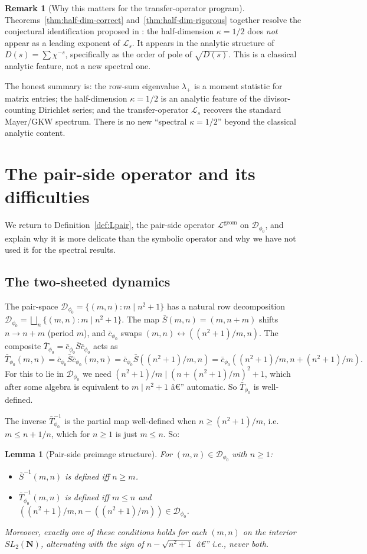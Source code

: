 ﻿\documentclass[11pt]{article}
\newtheorem{lemma}[theorem]{Lemma}
\theoremstyle{definition}
\newtheorem{remark}[theorem]{Remark}
\newcommand{\N}{\mathbf{N}}
\newcommand{\SLN}{SL_2(\N)}
\newcommand{\Dphi}{\mathcal{D}_{\phi_0}}
\newcommand{\Sb}{\bar{S}}
\newcommand{\Tb}{\bar{T}_{\phi_0}}
\newcommand{\cb}{\bar{c}_{\phi_0}}
\newcommand{\Lop}{\mathcal{L}}
\begin{document}
\begin{remark}[Why this matters for the transfer-operator program]
Theorems~\ref{thm:half-dim-correct} and~\ref{thm:half-dim-rigorous} together resolve the conjectural identification proposed in \cite[B7]{shakovnotes}: the half-dimension $\kappa=1/2$ does \emph{not} appear as a leading exponent of $\Lop_s$. It appears in the analytic structure of $D(s)=\sum\chi^{-s}$, specifically as the order of pole of $\sqrt{D(s)}$. This is a classical analytic feature, not a new spectral one.

The honest summary is: the row-sum eigenvalue $\lambda_+$ is a moment statistic for matrix entries; the half-dimension $\kappa=1/2$ is an analytic feature of the divisor-counting Dirichlet series; and the transfer-operator $\Lop_s$ recovers the standard Mayer/GKW spectrum. There is no new ``spectral $\kappa=1/2$'' beyond the classical analytic content.
\end{remark}

\section{The pair-side operator and its difficulties}\label{sec:pair-side}

We return to Definition~\ref{def:Lpair}, the pair-side operator $\Lop^{\mathrm{geom}}$ on $\Dphi$, and explain why it is more delicate than the symbolic operator and why we have not used it for the spectral results.

\subsection{The two-sheeted dynamics}

The pair-space $\Dphi=\{(m,n):m\mid n^2+1\}$ has a natural row decomposition $\Dphi=\bigsqcup_n\{(m,n):m\mid n^2+1\}$. The map $\Sb(m,n)=(m,n+m)$ shifts $n\to n+m$ (period $m$), and $\cb$ swaps $(m,n)\leftrightarrow((n^2+1)/m,n)$. The composite $\Tb=\cb\Sb\cb$ acts as
\[
\Tb(m,n) = \cb\Sb\cb(m,n) = \cb\Sb((n^2+1)/m,n) = \cb((n^2+1)/m,n+(n^2+1)/m).
\]
For this to lie in $\Dphi$ we need $(n^2+1)/m \mid (n+(n^2+1)/m)^2+1$, which after some algebra is equivalent to $m \mid n^2+1$ â€” automatic. So $\Tb$ is well-defined.

The inverse $\Tb^{-1}$ is the partial map well-defined when $n\ge (n^2+1)/m$, i.e.\ $m\le n+1/n$, which for $n\ge 1$ is just $m\le n$. So:

\begin{lemma}[Pair-side preimage structure]\label{lem:preimage}
For $(m,n)\in\Dphi$ with $n\ge 1$:
\begin{itemize}
\item $\Sb^{-1}(m,n)$ is defined iff $n\ge m$.
\item $\Tb^{-1}(m,n)$ is defined iff $m\le n$ and $((n^2+1)/m,n-((n^2+1)/m))\in\Dphi$.
\end{itemize}
Moreover, exactly one of these conditions holds for each $(m,n)$ on the interior $\SLN$, alternating with the sign of $n-\sqrt{n^2+1}$ â€” i.e., never both.
\end{lemma}
\end{document}
